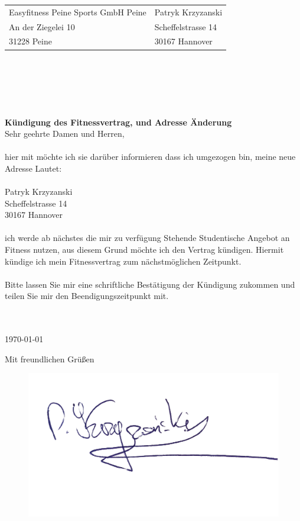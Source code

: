 \documentclass{letter}
\begin{document}
\begin{letter}{}
\begin{tabular}{@{}p{3.0in}l}
Easyfitness Peine Sports GmbH Peine	& Patryk Krzyzanski\\
An der Ziegelei 10					& Scheffelstrasse 14\\
31228 Peine							& 30167 Hannover\\
\end{tabular}\\ \\ \\ \\
\bigskip
\\
\Large\textbf{K\"undigung des Fitnessvertrag, und Adresse Änderung}\\
\bigskip
\normalsize
Sehr geehrte Damen und Herren, \\\\
hier mit möchte ich sie darüber informieren dass ich umgezogen bin, meine neue Adresse Lautet:\\\\
Patryk Krzyzanski\\
Scheffelstrasse 14\\
30167 Hannover\\\\
ich werde ab nächstes die mir zu verfügung Stehende Studentische Angebot an Fitness nutzen, aus diesem Grund möchte ich den 
Vertrag kündigen. 
Hiermit kündige ich mein Fitnessvertrag zum nächstmöglichen Zeitpunkt.\\\\
Bitte lassen Sie mir eine schriftliche Bestätigung der Kündigung zukommen und teilen Sie mir den Beendigungszeitpunkt mit.\\ \\
\\
\bigskip

\today
 
\closing{Mit freundlichen Grüßen}
\begin{figure}
  \includegraphics[width=0.5\linewidth]{podpis.jpg}
\end{figure}



\end{letter}
\end{document}
